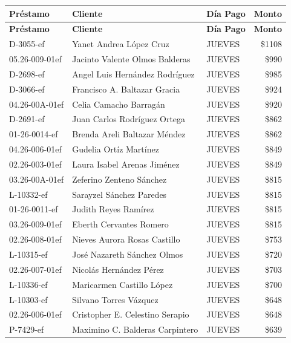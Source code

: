 \documentclass[11pt,a4paper]{article}
\newcommand{\money}[1]{\$\num{#1}}
\begin{document}
\begin{center}
\renewcommand{\arraystretch}{1.1}
\footnotesize
\begin{longtable}{lp{5.5cm}lr}
\toprule
\textbf{Pr\'estamo} & \textbf{Cliente} & \textbf{D\'ia Pago} & \textbf{Monto} \\
\midrule
\endfirsthead
\toprule
\textbf{Pr\'estamo} & \textbf{Cliente} & \textbf{D\'ia Pago} & \textbf{Monto} \\
\midrule
\endhead
D-3055-ef & Yanet Andrea L\'opez Cruz & JUEVES & \money{1108} \\
05.26-009-01ef & Jacinto Valente Olmos Balderas & JUEVES & \money{990} \\
D-2698-ef & Angel Luis Hern\'andez Rodr\'iguez & JUEVES & \money{985} \\
D-3066-ef & Francisco A. Baltazar Gracia & JUEVES & \money{924} \\
04.26-00A-01ef & Celia Camacho Barrag\'an & JUEVES & \money{920} \\
D-2691-ef & Juan Carlos Rodr\'iguez Ortega & JUEVES & \money{862} \\
01-26-0014-ef & Brenda Areli Baltazar M\'endez & JUEVES & \money{862} \\
04.26-006-01ef & Gudelia Ort\'iz Mart\'inez & JUEVES & \money{849} \\
02.26-003-01ef & Laura Isabel Arenas Jim\'enez & JUEVES & \money{849} \\
03.26-00A-01ef & Zeferino Zenteno S\'anchez & JUEVES & \money{815} \\
L-10332-ef & Sarayzel S\'anchez Paredes & JUEVES & \money{815} \\
01-26-0011-ef & Judith Reyes Ram\'irez & JUEVES & \money{815} \\
03.26-009-01ef & Eberth Cervantes Romero & JUEVES & \money{815} \\
02.26-008-01ef & Nieves Aurora Rosas Castillo & JUEVES & \money{753} \\
L-10315-ef & Jos\'e Nazareth S\'anchez Olmos & JUEVES & \money{720} \\
02.26-007-01ef & Nicol\'as Hern\'andez P\'erez & JUEVES & \money{703} \\
L-10336-ef & Maricarmen Castillo L\'opez & JUEVES & \money{700} \\
L-10303-ef & Silvano Torres V\'azquez & JUEVES & \money{648} \\
02.26-006-01ef & Cristopher E. Celestino Serapio & JUEVES & \money{648} \\
P-7429-ef & Maximino C. Balderas Carpintero & JUEVES & \money{639} \\

\end{longtable}
\end{center}
\end{document}
